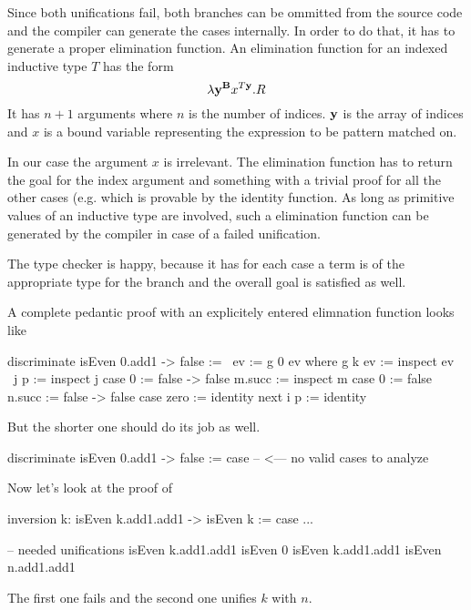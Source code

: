 Since both unifications fail, both branches can be ommitted from the source code
and the compiler can generate the cases internally. In order to do that, it has
to generate a proper elimination function. An elimination function for an
indexed inductive type $T$ has the form
$$
    \lambda \mathbf{y}^{\mathbf{B}} x^{T \mathbf{y}}. R
$$
It has $n + 1$ arguments where $n$ is the number of indices. $\mathbf{y}$ is the
array of indices and $x$ is a bound variable representing the expression to be
pattern matched on.

In our case the argument $x$ is irrelevant. The elimination function has to
return the goal  for the index argument  and
something with a trivial proof for all the other cases (e.g. 
which is provable by the identity function. As long as primitive values of an
inductive type are involved, such a elimination function can be generated by the
compiler in case of a failed unification.

The type checker is happy, because it has for each case a term is of the
appropriate type for the branch and the overall goal is satisfied as well.

A complete pedantic proof with an explicitely entered elimnation function looks
like
\begin{alba}
    discriminate isEven 0.add1 -> false :=
        \ ev := g 0 ev where
            g k ev :=
                inspect
                    ev
                    \ j p := inspect j case
                        0 := false -> false
                        m.succ :=
                            inspect m case
                                0 := false
                                n.succ := false -> false
                case
                    zero :=
                        identity
                    next i p :=
                        identity
\end{alba}
But the shorter one should do its job as well.
\begin{alba}
    discriminate isEven 0.add1 -> false :=
        case --  <--- no valid cases to analyze
\end{alba}

\vskip 5mm
Now let's look at the proof of

\begin{alba}
    inversion k: isEven k.add1.add1 -> isEven k :=
        case ...

    -- needed unifications
    isEven k.add1.add1        isEven 0
    isEven k.add1.add1        isEven n.add1.add1
\end{alba}
The first one fails and the second one unifies $k$ with $n$.




